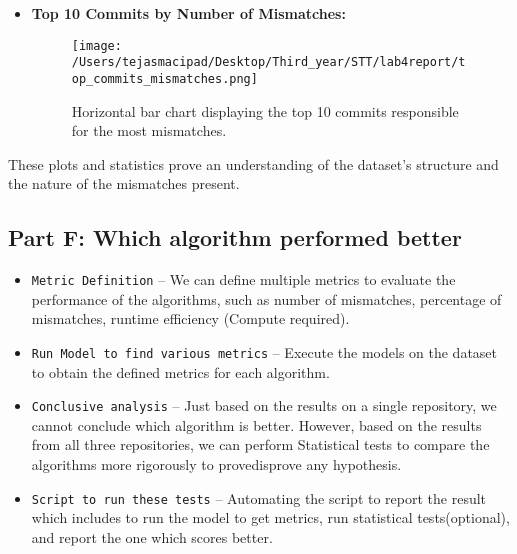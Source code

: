 \documentclass[12pt,a4paper]{article}
\begin{document}
\begin{enumerate}
\begin{itemize}
            \item \textbf{Top 10 Commits by Number of Mismatches:}  
            \begin{figure}[!h]
                \centering
                \texttt{[image: /Users/tejasmacipad/Desktop/Third\_year/STT/lab4report/top\_commits\_mismatches.png]}
                \caption{Horizontal bar chart displaying the top 10 commits responsible for the most mismatches.}
            \end{figure}
        \end{itemize}
\end{enumerate}

These plots and statistics prove an understanding of the dataset's structure and the nature of the mismatches present.

\subsection*{Part F: Which algorithm performed better}
\begin{itemize}
    \item \texttt{Metric Definition} -- We can define multiple metrics to evaluate the performance of the algorithms, such as number of mismatches, percentage of mismatches, runtime efficiency (Compute required).
    \item \texttt{Run Model to find various metrics} -- Execute the models on the dataset to obtain the defined metrics for each algorithm.
    \item \texttt{Conclusive analysis} -- Just based on the results on a single repository, we cannot conclude which algorithm is better. However, based on the results from all three repositories, we can perform Statistical tests to compare the algorithms more rigorously to prove\/disprove any hypothesis.
    \item \texttt{Script to run these tests} -- Automating the script to report the result which includes to run the model to get metrics, run statistical tests(optional), and report the one which scores better.
\end{itemize}
\end{document}
